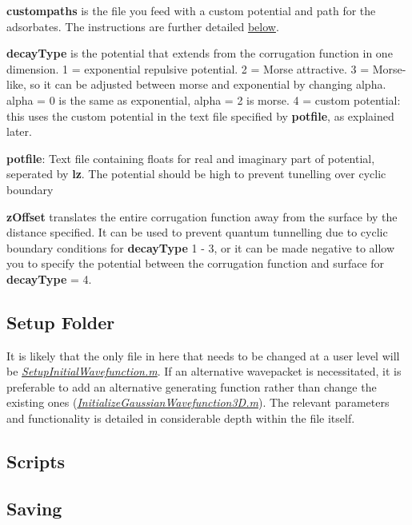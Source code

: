 \documentclass[11pt,letterpaper]{article}
\renewcommand{\\}{\bigskip}
\begin{document}
\textbf{custompaths} is the file you feed with a custom potential and path for the adsorbates. The instructions are further detailed \hyperref[sec:custompaths]{below}.\\


\textbf{decayType} is the potential that extends from the corrugation function in one dimension. 1 = exponential repulsive potential. 2 = Morse attractive. 3 = Morse-like, so it can be adjusted between morse and exponential by changing alpha. alpha = 0 is the same as exponential, alpha = 2 is morse. 4 = custom potential: this uses the custom potential in the text file specified by \textbf{potfile}, as explained later.\\

    
\textbf{potfile}: Text file containing floats for real and imaginary part of potential, seperated by \textbf{lz}. The potential should be high to prevent tunelling over cyclic boundary\\

\textbf{zOffset} translates the entire corrugation function away from the surface by the distance specified. It can be used to prevent quantum tunnelling due to cyclic boundary conditions for \textbf{decayType} 1 - 3, or it can be made negative to allow you to specify the potential between the corrugation function and surface for
\textbf{decayType} = 4.\\

\subsection{Setup Folder}

It is likely that the only file in here that needs to be changed at a user level will be \textit{\ul{SetupInitialWavefunction.m}}. If an alternative wavepacket is necessitated, it is preferable to add an alternative generating function rather than change the existing ones (\textit{\ul{InitializeGaussianWavefunction3D.m}}). The relevant parameters and functionality is detailed in considerable depth within the file itself.

\subsection{Scripts}

\subsection{Saving}
\end{document}

